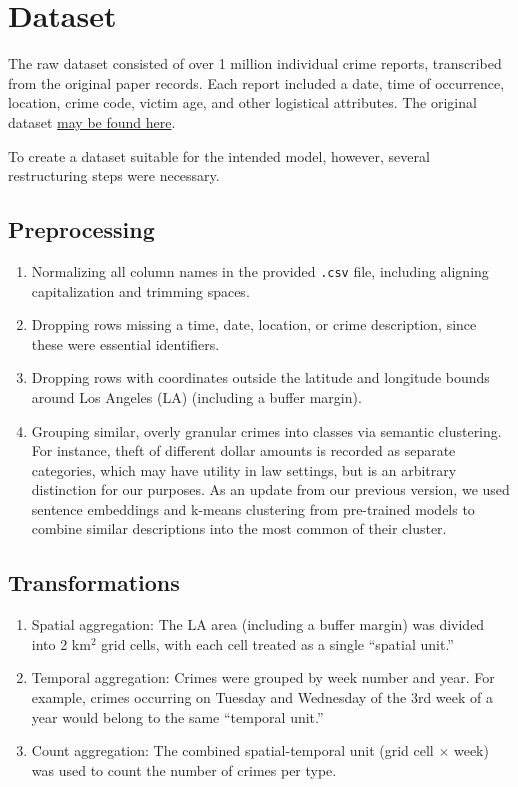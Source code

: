 \documentclass[11pt]{article}
\begin{document}

\section{Dataset}

The raw dataset consisted of over 1 million individual crime reports, transcribed from the original paper records. Each report included a date, time of occurrence, location, crime code, victim age, and other logistical attributes. The original dataset \href{https://www.kaggle.com/datasets/cityofLA/crime-in-los-angeles}{may be found here}.

To create a dataset suitable for the intended model, however, several restructuring steps were necessary.

\subsection{Preprocessing}
\begin{enumerate}
    \item Normalizing all column names in the provided \texttt{.csv} file, including aligning capitalization and trimming spaces.
    \item Dropping rows missing a time, date, location, or crime description, since these were essential identifiers.
    \item Dropping rows with coordinates outside the latitude and longitude bounds around Los Angeles (LA) (including a buffer margin).
    \item Grouping similar, overly granular crimes into classes via semantic clustering. For instance, theft of different dollar amounts is recorded as separate categories, which may have utility in law settings, but is an arbitrary distinction for our purposes. As an update from our previous version, we used sentence embeddings and k-means clustering from pre-trained models to combine similar descriptions into the most common of their cluster.
\end{enumerate}

\subsection{Transformations}
\begin{enumerate}
    \item Spatial aggregation: The LA area (including a buffer margin) was divided into 2 km$^2$ grid cells, with each cell treated as a single ``spatial unit.''
    \item Temporal aggregation: Crimes were grouped by week number and year. For example, crimes occurring on Tuesday and Wednesday of the 3rd week of a year would belong to the same ``temporal unit.''
    \item Count aggregation: The combined spatial-temporal unit (grid cell $\times$ week) was used to count the number of crimes per type.
\end{enumerate}
\end{document}
